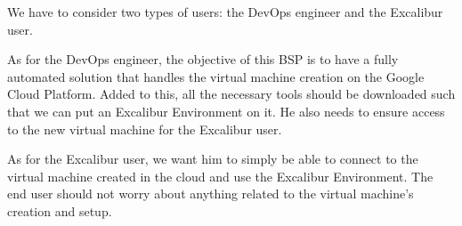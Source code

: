 We have to consider two types of users: the DevOps engineer and the
Excalibur user.

As for the DevOps engineer, the objective of this BSP is to have a
fully automated solution that handles the virtual machine creation on
the Google Cloud Platform.  Added to this, all the necessary tools
should be downloaded such that we can put an Excalibur Environment on
it. He also needs to ensure access to the new virtual machine for the
Excalibur user.

As for the Excalibur user, we want him to simply be able to connect to
the virtual machine created in the cloud and use the Excalibur
Environment. The end user should not worry about anything related to
the virtual machine's creation and setup.

